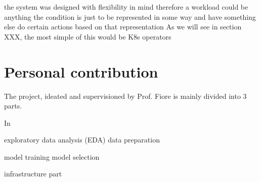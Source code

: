 the system was designed with flexibility in mind therefore a workload could be anything
the condition is just to be represented in some way and have something else do certain actions based on that representation
As we will see in section XXX, the most simple of this would be K8s operators

\section{Personal contribution}

The project, ideated and supervisioned by Prof. Fiore is mainly divided into 3 parts.

In 

exploratory data analysis (EDA)
data preparation

model training
model selection

infrastructure part


\newpage

